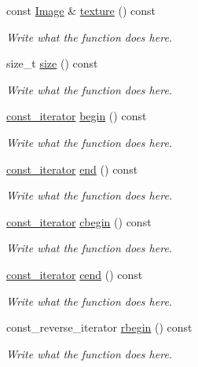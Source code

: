 \begin{DoxyCompactItemize}
\item 
const \hyperlink{classImage}{Image} \& \hyperlink{classMesh__t_ab6e561d676c5e24beae4d91525f085f9}{texture} () const 
\begin{DoxyCompactList}\small\item\em Write what the function does here. \end{DoxyCompactList}\item 
size\+\_\+t \hyperlink{classMesh__t_af88e39eab33c8312ea9d8e797babfa4a}{size} () const 
\begin{DoxyCompactList}\small\item\em Write what the function does here. \end{DoxyCompactList}\item 
\hyperlink{classMesh__t_1_1const__iterator}{const\+\_\+iterator} \hyperlink{classMesh__t_aa2944534e6db5098c9abeb6510c5506b}{begin} () const 
\begin{DoxyCompactList}\small\item\em Write what the function does here. \end{DoxyCompactList}\item 
\hyperlink{classMesh__t_1_1const__iterator}{const\+\_\+iterator} \hyperlink{classMesh__t_a75aef670e999a522a6ff9a5bcb810dc7}{end} () const 
\begin{DoxyCompactList}\small\item\em Write what the function does here. \end{DoxyCompactList}\item 
\hyperlink{classMesh__t_1_1const__iterator}{const\+\_\+iterator} \hyperlink{classMesh__t_af334cc0fbdb50f6a14cbc1f207fc4fda}{cbegin} () const 
\begin{DoxyCompactList}\small\item\em Write what the function does here. \end{DoxyCompactList}\item 
\hyperlink{classMesh__t_1_1const__iterator}{const\+\_\+iterator} \hyperlink{classMesh__t_a9455c3ed5595b648546a06a322ecd6fc}{cend} () const 
\begin{DoxyCompactList}\small\item\em Write what the function does here. \end{DoxyCompactList}\item 
const\+\_\+reverse\+\_\+iterator \hyperlink{classMesh__t_ab8bc7050b907d86334a403eb1950f408}{rbegin} () const 
\begin{DoxyCompactList}\small\item\em Write what the function does here. \end{DoxyCompactList}\item 

\end{DoxyCompactItemize}

